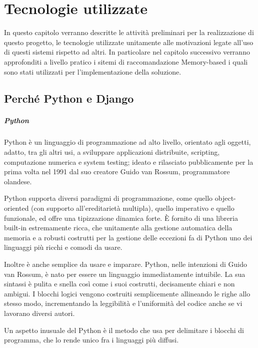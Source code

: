 \chapter{Tecnologie utilizzate}
In questo capitolo verranno descritte le attività preliminari per la realizzazione di questo progetto, le tecnologie utilizzate
unitamente alle motivazioni legate all'uso di questi sistemi rispetto ad altri. In particolare nel capitolo successivo verranno 
approfonditi a livello pratico i sitemi di raccomandazione Memory-based i quali sono stati utilizzati per l'implementazione della
soluzione. 


\section{Perché Python e Django}
\paragraph{Python}
Python è un linguaggio di programmazione ad alto livello, orientato agli oggetti, adatto, tra gli altri usi, a sviluppare applicazioni 
distribuite, scripting, computazione numerica e system testing; ideato e rilasciato pubblicamente per la prima volta nel 1991 dal suo 
creatore Guido van Rossum, programmatore olandese.

Python supporta diversi paradigmi di programmazione, come quello object-oriented (con supporto all'ereditarietà multipla), quello 
imperativo e quello funzionale, ed offre una tipizzazione dinamica forte. È fornito di una libreria built-in estremamente ricca, che 
unitamente alla gestione automatica della memoria e a robusti costrutti per la gestione delle eccezioni fa di Python uno dei linguaggi 
più ricchi e comodi da usare.

Inoltre è anche semplice da usare e imparare. Python, nelle intenzioni di Guido van Rossum, è nato per essere un linguaggio 
immediatamente intuibile. La sua sintassi è pulita e snella così come i suoi costrutti, decisamente chiari e non ambigui. I blocchi 
logici vengono costruiti semplicemente allineando le righe allo stesso modo, incrementando la leggibilità e l'uniformità del codice 
anche se vi lavorano diversi autori.

Un aspetto inusuale del Python è il metodo che usa per delimitare i blocchi di programma, che lo rende unico fra i linguaggi più diffusi.


